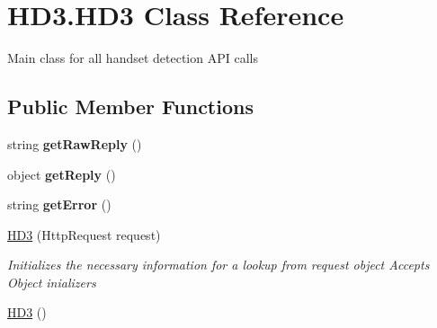 \hypertarget{class_h_d3_1_1_h_d3}{\section{H\+D3.\+H\+D3 Class Reference}
\label{class_h_d3_1_1_h_d3}
}


Main class for all handset detection A\+P\+I calls  


\subsection*{Public Member Functions}
\begin{DoxyCompactItemize}
\item 
\hypertarget{class_h_d3_1_1_h_d3_a08cdeab81f9bddbfb126a7321ea2fd8c}{string {\bfseries get\+Raw\+Reply} ()}\label{class_h_d3_1_1_h_d3_a08cdeab81f9bddbfb126a7321ea2fd8c}

\item 
\hypertarget{class_h_d3_1_1_h_d3_ad5bc44db014128888296240f6073f485}{object {\bfseries get\+Reply} ()}\label{class_h_d3_1_1_h_d3_ad5bc44db014128888296240f6073f485}

\item 
\hypertarget{class_h_d3_1_1_h_d3_a3dc243815bb91775b05d6fb148959983}{string {\bfseries get\+Error} ()}\label{class_h_d3_1_1_h_d3_a3dc243815bb91775b05d6fb148959983}

\item 
\hyperlink{class_h_d3_1_1_h_d3_a0a238bb9c0e43132312e5c863292c577}{H\+D3} (Http\+Request request)
\begin{DoxyCompactList}\small\item\em Initializes the necessary information for a lookup from request object Accepts Object inializers \end{DoxyCompactList}\item 
\hypertarget{class_h_d3_1_1_h_d3_a6f369b558b21414a20af987df0007a75}{\hyperlink{class_h_d3_1_1_h_d3_a6f369b558b21414a20af987df0007a75}{H\+D3} ()}\label{class_h_d3_1_1_h_d3_a6f369b558b21414a20af987df0007a75}


\end{DoxyCompactItemize}
